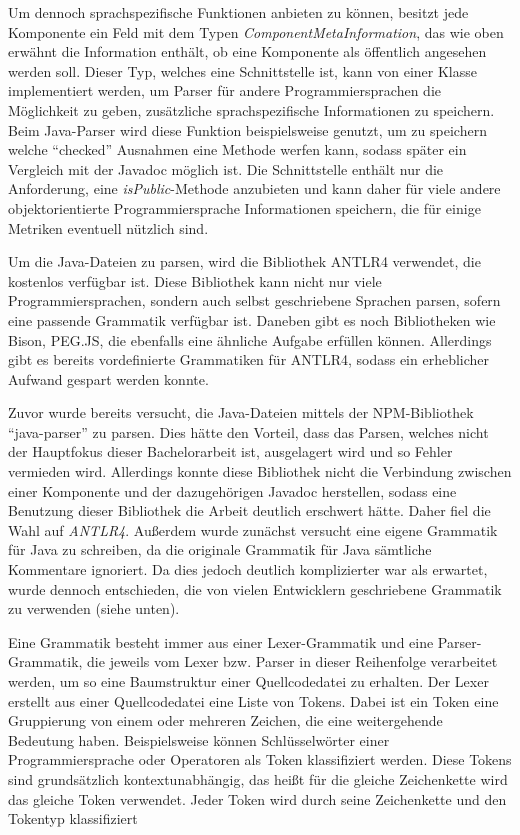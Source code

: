 Um dennoch sprachspezifische Funktionen anbieten zu können, besitzt jede Komponente ein Feld mit dem Typen \textit{ComponentMetaInformation}, das wie oben erwähnt die Information enthält, ob eine Komponente als öffentlich angesehen werden soll. Dieser Typ, welches eine Schnittstelle ist, kann von einer Klasse implementiert werden, um Parser für andere Programmiersprachen die Möglichkeit zu geben, zusätzliche sprachspezifische Informationen zu speichern. Beim Java-Parser wird diese Funktion beispielsweise genutzt, um zu speichern welche \enquote{checked} Ausnahmen eine Methode werfen kann, sodass später ein Vergleich mit der Javadoc möglich ist. Die Schnittstelle enthält nur die Anforderung, eine \textit{isPublic}-Methode anzubieten und kann daher für viele andere objektorientierte Programmiersprache Informationen speichern, die für einige Metriken eventuell nützlich sind. 

Um die Java-Dateien zu parsen, wird die Bibliothek ANTLR4 verwendet, die kostenlos verfügbar ist. Diese Bibliothek kann nicht nur viele Programmiersprachen, sondern auch selbst geschriebene Sprachen parsen, sofern eine passende Grammatik verfügbar ist. Daneben gibt es noch Bibliotheken wie Bison, PEG.JS, die ebenfalls eine ähnliche Aufgabe erfüllen können. Allerdings gibt es bereits vordefinierte Grammatiken für ANTLR4, sodass ein erheblicher Aufwand gespart werden konnte.  

Zuvor wurde bereits versucht, die Java-Dateien mittels der NPM-Bibliothek \enquote{java-parser} \cite{Java-parser} zu parsen. Dies hätte den Vorteil, dass das Parsen, welches nicht der Hauptfokus dieser Bachelorarbeit ist, ausgelagert wird und so Fehler vermieden wird. Allerdings konnte diese Bibliothek nicht die Verbindung zwischen einer Komponente und der dazugehörigen Javadoc herstellen, sodass eine Benutzung dieser Bibliothek die Arbeit deutlich erschwert hätte. Daher fiel die Wahl auf \textit{ANTLR4}. Außerdem wurde zunächst versucht eine eigene Grammatik für Java zu schreiben, da die originale Grammatik für Java sämtliche Kommentare ignoriert. Da dies jedoch deutlich komplizierter war als erwartet, wurde dennoch entschieden, die von vielen Entwicklern geschriebene Grammatik zu verwenden (siehe unten).

Eine Grammatik besteht immer aus einer Lexer-Grammatik und eine Parser-Grammatik, die jeweils vom Lexer bzw. Parser in dieser Reihenfolge verarbeitet werden, um so eine Baumstruktur einer Quellcodedatei zu erhalten. Der Lexer erstellt aus einer Quellcodedatei eine Liste von Tokens. Dabei ist ein Token eine Gruppierung von einem oder mehreren Zeichen, die eine weitergehende Bedeutung haben. Beispielsweise können Schlüsselwörter einer Programmiersprache oder Operatoren als Token klassifiziert werden. Diese Tokens sind grundsätzlich kontextunabhängig, das heißt für die gleiche Zeichenkette wird das gleiche Token verwendet. Jeder Token wird durch seine Zeichenkette und den Tokentyp klassifiziert

